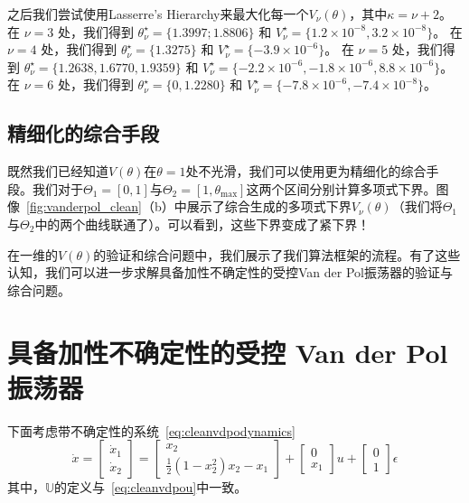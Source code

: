 之后我们尝试使用Lasserre's Hierarchy来最大化每一个$V_\nu(\theta)$，其中$\kappa = \nu + 2$。在 $\nu=3$ 处，我们得到 $\theta_\nu^\star = \{ 1.3997;1.8806 \}$ 和 $V_\nu^\star = \{1.2\times 10^{-8},3.2 \times 10^{-8} \}$。 在 $\nu=4$ 处，我们得到 $\theta_\nu^\star = \{ 1.3275 \}$ 和 $V_\nu^\star = \{-3.9\times 10^{-6} \}$。 在 $\nu=5$ 处，我们得到 $\theta_\nu^\star = \{ 1.2638, 1.6770, 1.9359 \}$ 和 $V_\nu^\star = \{-2.2\times 10^{-6} , -1.8 \times 10^{-6}, 8.8 \times 10^{-6} \}$。 在 $\nu=6$ 处，我们得到 $\theta_\nu^\star = \{ 0,1.2280 \}$ 和 $V_\nu^\star = \{-7.8\times 10^{-6}, - 7.4\times 10^{-8}\}$。

\subsection{精细化的综合手段}
既然我们已经知道$V(\theta)$在$\theta = 1$处不光滑，我们可以使用更为精细化的综合手段。我们对于$\Theta_1 = [0, 1]$与$\Theta_2 = [1, \theta_{\max}]$这两个区间分别计算多项式下界。图像~\ref{fig:vanderpol_clean}（b）中展示了综合生成的多项式下界$V_\nu(\theta)$（我们将$\Theta_1$与$\Theta_2$中的两个曲线联通了）。可以看到，这些下界变成了紧下界！

在一维的$V(\theta)$的验证和综合问题中，我们展示了我们算法框架的流程。有了这些认知，我们可以进一步求解具备加性不确定性的受控Van der Pol振荡器的验证与综合问题。

\section{具备加性不确定性的受控 Van der Pol 振荡器}
\label{sec:uncertainvanderpol}

下面考虑带不确定性的系统~\eqref{eq:cleanvdpodynamics}
\begin{equation}\label{eq:vdpodynamics}
    \dot{x} = \left[ \begin{array}{c}
        \dot{x}_1 \\ \dot{x}_2
    \end{array} \right] 
    = \left[ \begin{array}{c}
        x_2 \\
        \frac{1}{2}(1 - x_2^2) x_2 - x_1
    \end{array} \right]
    + \left[ \begin{array}{c}
        0 \\ x_1
    \end{array} \right] u
    + \left[ \begin{array}{c}
        0 \\ 1
    \end{array} \right] \epsilon
\end{equation}
其中，$\mathbb{U}$的定义与~\eqref{eq:cleanvdpou}中一致。

